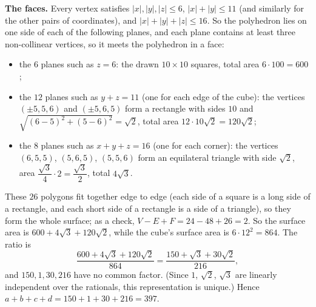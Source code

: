 \textbf{The faces.} Every vertex satisfies $|x|,|y|,|z|\le6$, $|x|+|y|\le11$ (and similarly for the other pairs of coordinates), and $|x|+|y|+|z|\le16$. So the polyhedron lies on one side of each of the following planes, and each plane contains at least three non-collinear vertices, so it meets the polyhedron in a face:
\begin{itemize}
\item the $6$ planes such as $z=6$: the drawn $10\times10$ squares, total area $6\cdot100=600$;
\item the $12$ planes such as $y+z=11$ (one for each edge of the cube): the vertices $(\pm5,5,6)$ and $(\pm5,6,5)$ form a rectangle with sides $10$ and $\sqrt{(6-5)^2+(5-6)^2}=\sqrt2$, total area $12\cdot10\sqrt2=120\sqrt2$;
\item the $8$ planes such as $x+y+z=16$ (one for each corner): the vertices $(6,5,5)$, $(5,6,5)$, $(5,5,6)$ form an equilateral triangle with side $\sqrt2$, area $\dfrac{\sqrt3}{4}\cdot2=\dfrac{\sqrt3}{2}$, total $4\sqrt3$.
\end{itemize}
These $26$ polygons fit together edge to edge (each side of a square is a long side of a rectangle, and each short side of a rectangle is a side of a triangle), so they form the whole surface; as a check, $V-E+F=24-48+26=2$. So the surface area is $600+4\sqrt3+120\sqrt2$, while the cube's surface area is $6\cdot12^2=864$. The ratio is
\[\dfrac{600+4\sqrt3+120\sqrt2}{864}=\dfrac{150+\sqrt3+30\sqrt2}{216},\]
and $150,1,30,216$ have no common factor. (Since $1$, $\sqrt2$, $\sqrt3$ are linearly independent over the rationals, this representation is unique.) Hence $a+b+c+d=150+1+30+216=\boxed{397}$.
